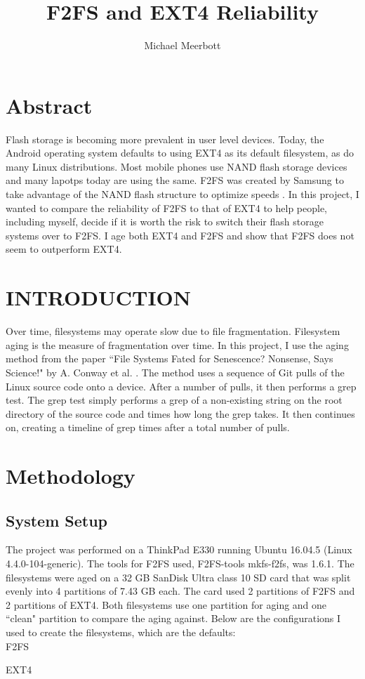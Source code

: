 \documentclass[a4paper, 10pt, conference]{ieeeconf}
\title{\LARGE \bf F2FS and EXT4 Reliability}
\author{Michael Meerbott}
\begin{document}
\maketitle
\thispagestyle{empty}
\pagestyle{empty}

\section*{Abstract}
Flash storage is becoming more prevalent in user level devices. Today, the 
Android operating system defaults to using EXT4 as its default filesystem, as 
do many Linux distributions. Most mobile phones use NAND flash storage devices
and many lapotps today are using the same. F2FS was created by Samsung to 
take advantage of the NAND flash structure to optimize speeds \cite{c0}. 
In this project, I wanted to compare the reliability of F2FS to that of EXT4 to
help people, including myself, decide if it is worth the risk to switch 
their flash storage systems over to F2FS. I age both EXT4 and F2FS and show 
that F2FS does not seem to outperform EXT4.

\section{INTRODUCTION}
Over time, filesystems may operate slow due to file fragmentation. Filesystem
aging is the measure of fragmentation over time. In this project, I use the
aging method from the paper ``File Systems Fated for Senescence? Nonsense, 
Says Science!" by A. Conway et al. \cite{c1}. The method uses a sequence of 
Git pulls of the Linux source code onto a device. After a number of pulls, it 
then performs a grep test. The grep test simply performs a grep of a 
non-existing string on the root directory of the source code and times how long
the grep takes. It then continues on, creating a timeline of grep times after
a total number of pulls. 

\section{Methodology}
\subsection*{System Setup}
The project was performed on a ThinkPad E330 running Ubuntu 16.04.5 (Linux
4.4.0-104-generic). The tools for F2FS used, F2FS-tools mkfs-f2fs, was 1.6.1.
The filesystems were aged on a 32 GB SanDisk Ultra class 10 SD 
card that was split evenly into 4 partitions of 7.43 GB each. The 
card used 2 partitions of F2FS and 2 partitions of EXT4. Both filesystems use
one partition for aging and one ``clean" partition to compare the aging against.
Below are the configurations I used to create the filesystems, which are 
the defaults:
\\[10pt]
F2FS

EXT4

\end{document}

